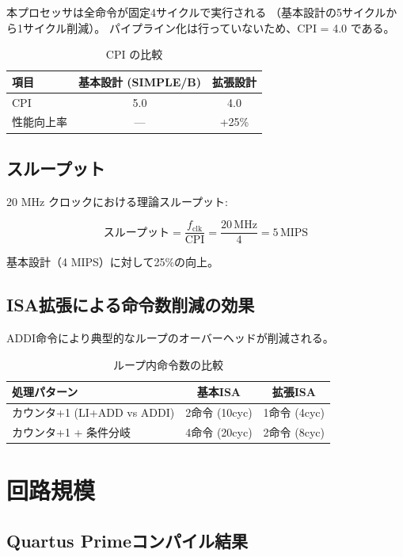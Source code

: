 \documentclass[a4paper,11pt]{ltjsarticle}
\begin{document}
本プロセッサは全命令が固定4サイクルで実行される
（基本設計の5サイクルから1サイクル削減）。
パイプライン化は行っていないため、CPI = 4.0 である。

\begin{table}[h]
\centering
\caption{CPI の比較}
\begin{tabular}{lcc}
\toprule
項目 & 基本設計 (SIMPLE/B) & 拡張設計 \\
\midrule
CPI & 5.0 & 4.0 \\
性能向上率 & --- & +25\% \\
\bottomrule
\end{tabular}
\end{table}

\subsection{スループット}

20 MHz クロックにおける理論スループット:

\[
\text{スループット} = \frac{f_{\mathrm{clk}}}{\mathrm{CPI}} = \frac{20\,\mathrm{MHz}}{4} = 5\,\mathrm{MIPS}
\]

基本設計（4 MIPS）に対して25\%の向上。

\subsection{ISA拡張による命令数削減の効果}

ADDI命令により典型的なループのオーバーヘッドが削減される。

\begin{table}[h]
\centering
\caption{ループ内命令数の比較}
\begin{tabular}{lcc}
\toprule
処理パターン & 基本ISA & 拡張ISA \\
\midrule
カウンタ+1 (LI+ADD vs ADDI) & 2命令 (10cyc) & 1命令 (4cyc) \\
カウンタ+1 + 条件分岐 & 4命令 (20cyc) & 2命令 (8cyc) \\
\bottomrule
\end{tabular}
\end{table}


\section{回路規模}

\subsection{Quartus Primeコンパイル結果}
\end{document}
